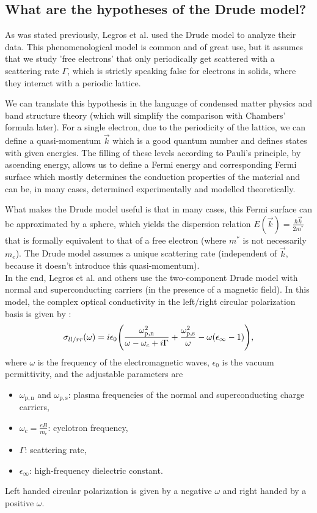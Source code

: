 \subsection{What are the hypotheses of the Drude model?}
As was stated previously, Legros et al. used the Drude model to analyze their data. 
This phenomenological model is common and of great use, but it assumes that we study 'free electrons' that only periodically get scattered with a scattering rate $\Gamma$, 
which is strictly speaking false for electrons in solids, 
where they interact with a periodic lattice.

We can translate this hypothesis in the language of condensed matter physics and band structure theory (which will simplify the comparison with Chambers' formula later). 
For a single electron, due to the periodicity of the lattice, 
we can define a quasi-momentum $\vec{k}$ which is a good quantum number and defines states with given energies. 
The filling of these levels according to Pauli's principle, by ascending energy, 
allows us to define a Fermi energy and corresponding Fermi surface 
which mostly determines the conduction properties of the material and can be, 
in many cases, determined experimentally and modelled theoretically.

What makes the Drude model useful is that in many cases, 
this Fermi surface can be approximated by a sphere, which yields the dispersion relation $E(\vec{k}) = \frac{\hbar\vec{k}}{2m^*}$ 
that is formally equivalent to that of a free electron (where $m^*$ is not necessarily $m_e$). 
The Drude model assumes a unique scattering rate (independent of $\vec{k}$, because it doesn't introduce this quasi-momentum). \\

In the end, Legros et al.\cite{legros2022} and others\cite{post2021} use the two-component Drude model with normal and superconducting carriers (in the presence of a magnetic field). 
In this model, the complex optical conductivity in the left/right circular polarization basis is given by :
\begin{equation}
    \sigma_{ll/rr}(\omega) = i\epsilon_0\qty(
        \frac{\omega^2_{\mathrm{p,n}}}{\omega-\omega_c+i\Gamma}
        + \frac{\omega^2_{\mathrm{p,s}}}{\omega} - \omega(\epsilon_{\infty} - 1)),
\end{equation}
where $\omega$ is the frequency of the electromagnetic waves, $\epsilon_0$ is the vacuum
permittivity, and the adjustable parameters are
\begin{itemize}
    \item $\omega_{\mathrm{p,n}}$ and $\omega_{\mathrm{p,s}}$: plasma frequencies of the normal and
        superconducting charge carriers,
    \item $\omega_c = \frac{eB}{m_c}$: cyclotron frequency,
    \item $\Gamma$: scattering rate,
    \item $\epsilon_{\infty}$: high-frequency dielectric constant.
\end{itemize}
Left handed circular polarization is given by a negative $\omega$ and right handed by a positive $\omega$.

